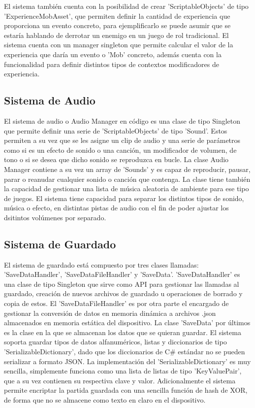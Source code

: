 El sistema también cuenta con la posibilidad de crear 'ScriptableObjects' de tipo 'ExperienceMobAsset', que permiten definir la cantidad de experiencia que proporciona un evento 
 concreto, para ejemplificarlo se puede asumir que se estaría hablando de derrotar un enemigo en un juego de rol tradicional. El sistema cuenta con un manager singleton que 
 permite calcular el valor de la experiencia que daría un evento o 'Mob' concreto, además cuenta con la funcionalidad para definir distintos tipos de contextos modificadores 
 de experiencia.


\subsection{Sistema de Audio}
El sistema de audio o Audio Manager en código es una clase de tipo Singleton que permite definir una serie de 'ScriptableObjects' de tipo 'Sound'. Estos permiten a su vez que 
se les asigne un clip de audio y una serie de parámetros como si es un efecto de sonido o una canción, un modificador de volumen, de tono o si se desea que dicho sonido 
se reproduzca en bucle. La clase Audio Manager contiene a su vez un array de 'Sounds' y es capaz de reproducir, pausar, parar o reanudar cualquier sonido o canción que contenga. 
La clase tiene también la capacidad de gestionar una lista de música aleatoria de ambiente para ese tipo de juegos. El sistema tiene capacidad para separar los distintos tipos de 
sonido, música o efecto, en distintas pistas de audio con el fin de poder ajustar los dsitintos volúmenes por separado.    

\subsection{Sistema de Guardado}
El sistema de guardado está compuesto por tres clases llamadas: 'SaveDataHandler', 'SaveDataFileHandler' y 'SaveData'. 'SaveDataHandler' es una clase de tipo Singleton que 
sirve como API para gestionar las llamadas al guardado, creación de nuevos archivos de guardado u operaciones de borrado y copia de estos. El 'SaveDataFileHandler' es por 
otra parte el encargado de gestionar la conversión de datos en memoria dinámica a archivos .json almacenados en memoria estática del dispositivo. La clase 'SaveData' por últimos
es la clase en la que se almacenan los datos que se quieran guardar. El sistema soporta guardar tipos de datos alfanuméricos, listas y diccionarios de tipo 
'SerializableDictionary', dado que los diccionarios de C\# estándar no se pueden serializar a formato JSON. La implementación del 'SerializableDictionary' es muy sencilla, 
simplemente funciona como una lista de listas de tipo 'KeyValuePair', que a su vez contienen su respectiva clave y valor. Adicionalmente el sistema permite encriptar la 
partida guardada con una sencilla función de hash de XOR, de forma que no se almacene como texto en claro en el dispositivo.  

